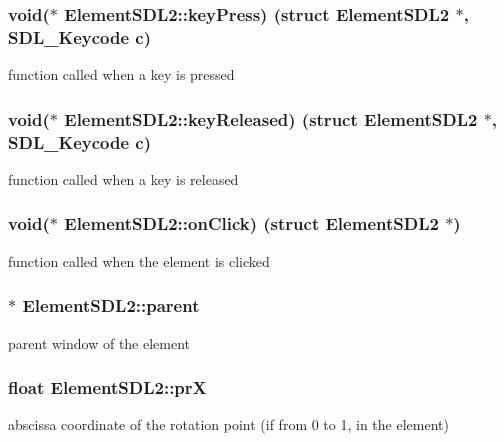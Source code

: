 \subsubsection[{\texorpdfstring{key\+Press}{keyPress}}]{\setlength{\rightskip}{0pt plus 5cm}void($\ast$ Element\+S\+D\+L2\+::key\+Press) (struct {\bf Element\+S\+D\+L2} $\ast$, S\+D\+L\+\_\+\+Keycode c)}\hypertarget{structElementSDL2_aff1dc935700d44a0ef0d53de7cca9d41}{}\label{structElementSDL2_aff1dc935700d44a0ef0d53de7cca9d41}
function called when a key is pressed 
\subsubsection[{\texorpdfstring{key\+Released}{keyReleased}}]{\setlength{\rightskip}{0pt plus 5cm}void($\ast$ Element\+S\+D\+L2\+::key\+Released) (struct {\bf Element\+S\+D\+L2} $\ast$, S\+D\+L\+\_\+\+Keycode c)}\hypertarget{structElementSDL2_a76ecf85adcb072db772a8351ea7e04ee}{}\label{structElementSDL2_a76ecf85adcb072db772a8351ea7e04ee}
function called when a key is released 
\subsubsection[{\texorpdfstring{on\+Click}{onClick}}]{\setlength{\rightskip}{0pt plus 5cm}void($\ast$ Element\+S\+D\+L2\+::on\+Click) (struct {\bf Element\+S\+D\+L2} $\ast$)}\hypertarget{structElementSDL2_ae56c022599e2e8acdda29fbb8af44942}{}\label{structElementSDL2_ae56c022599e2e8acdda29fbb8af44942}
function called when the element is clicked 
\subsubsection[{\texorpdfstring{parent}{parent}}]{$\ast$ Element\+S\+D\+L2\+::parent}\hypertarget{structElementSDL2_a9cd0b68349b49321423bec3136cf7e6e}{}\label{structElementSDL2_a9cd0b68349b49321423bec3136cf7e6e}
parent window of the element 
\subsubsection[{\texorpdfstring{prX}{prX}}]{\setlength{\rightskip}{0pt plus 5cm}float Element\+S\+D\+L2\+::prX}\hypertarget{structElementSDL2_a9b522d7b8bf6b476d142fd0058aff66c}{}\label{structElementSDL2_a9b522d7b8bf6b476d142fd0058aff66c}
abscissa coordinate of the rotation point (if from 0 to 1, in the element) 
